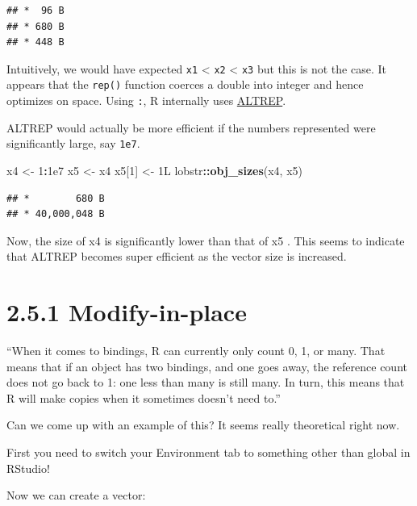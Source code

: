 \documentclass[]{book}
\newenvironment{Shaded}{\begin{snugshade}}{\end{snugshade}}
\newcommand{\DecValTok}[1]{\textcolor[rgb]{0.00,0.00,0.81}{#1}}
\newcommand{\FloatTok}[1]{\textcolor[rgb]{0.00,0.00,0.81}{#1}}
\newcommand{\KeywordTok}[1]{\textcolor[rgb]{0.13,0.29,0.53}{\textbf{#1}}}
\newcommand{\NormalTok}[1]{#1}
\newcommand{\OperatorTok}[1]{\textcolor[rgb]{0.81,0.36,0.00}{\textbf{#1}}}
\newcommand{\StringTok}[1]{\textcolor[rgb]{0.31,0.60,0.02}{#1}}
\begin{document}
\begin{verbatim}
## *  96 B
## * 680 B
## * 448 B
\end{verbatim}

Intuitively, we would have expected \texttt{x1} \textless{} \texttt{x2} \textless{} \texttt{x3} but this is not the case. It appears that the \texttt{rep()} function coerces a double into integer and hence optimizes on space. Using \texttt{:}, R internally uses \href{https://blog.revolutionanalytics.com/2017/09/altrep-preview.html}{ALTREP}.

ALTREP would actually be more efficient if the numbers represented were significantly large, say \texttt{1e7}.

\begin{Shaded}
\begin{Highlighting}[]
\NormalTok{x4 <-}\StringTok{ }\DecValTok{1}\OperatorTok{:}\FloatTok{1e7}
\NormalTok{x5 <-}\StringTok{ }\NormalTok{x4}
\NormalTok{x5[}\DecValTok{1}\NormalTok{] <-}\StringTok{ }\NormalTok{1L}
\NormalTok{lobstr}\OperatorTok{::}\KeywordTok{obj_sizes}\NormalTok{(x4, x5)}
\end{Highlighting}
\end{Shaded}

\begin{verbatim}
## *        680 B
## * 40,000,048 B
\end{verbatim}

Now, the size of x4 is significantly lower than that of x5 . This seems to indicate that ALTREP becomes super efficient as the vector size is increased.

\hypertarget{modify-in-place}{%
\section*{2.5.1 Modify-in-place}\label{modify-in-place}}

``When it comes to bindings, R can currently only count 0, 1, or many. That means that if an object has two bindings, and one goes away, the reference count does not go back to 1: one less than many is still many. In turn, this means that R will make copies when it sometimes doesn't need to.''

Can we come up with an example of this? It seems really theoretical right now.

First you need to switch your Environment tab to something other than global in RStudio!

Now we can create a vector:
\end{document}

